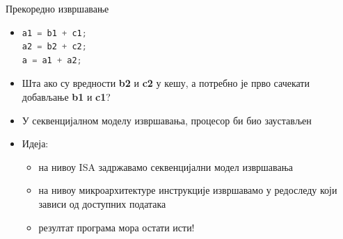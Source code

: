 \documentclass{beamer}
\begin{document}
    \begin{frame}[fragile]{Прекоредно извршавање}
        \begin{itemize}
            \item{
                \begin{lstlisting}[language=java]
a1 = b1 + c1;
a2 = b2 + c2;
a = a1 + a2;
                \end{lstlisting}
            }
            
            \item Шта ако су вредности \textbf{b2} и \textbf{c2} у кешу, а потребно је прво сачекати добављање \textbf{b1} и \textbf{c1}?
            \item У секвенцијалном моделу извршавања, процесор би био заустављен
            \item Идеја:
            \begin{itemize}
                \item на нивоу ISA задржавамо секвенцијални модел извршавања
                \item на нивоу микроархитектуре инструкције извршавамо у редоследу који зависи од доступних података
                \item резултат програма мора остати исти!
            \end{itemize}
        \end{itemize}
    \end{frame}
\end{document}
